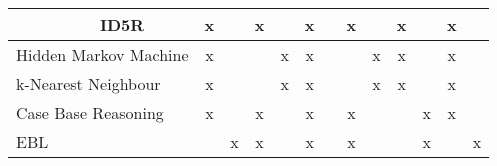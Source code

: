 \begin{table}[h!]
{\begin{tabular}{|l|c|c|c|c|c|c|c|c|c|c|c|c|c|}
 & ID5R & x &  & x &  & x &  & x &  & x &  & x &  \\ \hline
\multicolumn{2}{|l|}{Hidden Markov Machine} & x &  &  & x & x &  &  & x & x &  & x &  \\ \hline
\multicolumn{2}{|l|}{k-Nearest Neighbour} & x &  &  & x & x &  &  & x & x &  & x &  \\ \hline
\multicolumn{2}{|l|}{Case Base Reasoning} & x &  & x &  & x &  & x &  &  & x & x &  \\ \hline
\multicolumn{2}{|l|}{EBL} &  & x & x &  & x &  & x &  &  & x &  & x \\ \hline
\end{tabular}}
\end{table}
